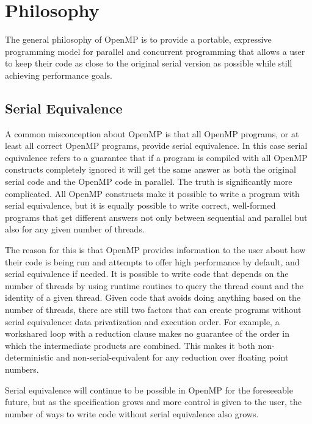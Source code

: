\section{Philosophy}
\label{sec:philosophy}



The general philosophy of OpenMP is to provide a portable, expressive
programming model for parallel and concurrent programming that allows a user to
keep their code as close to the original serial version as possible while still
achieving performance goals.

\subsection{Serial Equivalence}
\label{sub:serial_equivalence}

A common misconception about OpenMP is that all OpenMP programs, or at least all
correct OpenMP programs, provide serial equivalence. In this case serial
equivalence refers to a guarantee that if a program is compiled with all OpenMP
constructs completely ignored it will get the same answer as both the original
serial code and the OpenMP code in parallel.  The truth is significantly more
complicated.  All OpenMP constructs make it possible to write a program with
serial equivalence, but it is equally possible to write correct, well-formed
programs that get different answers not only between sequential and parallel but
also for any given number of threads.

The reason for this is that OpenMP provides information to the user about how
their code is being run and attempts to offer high performance by default, and
serial equivalence if needed.  It is possible to write code that depends on the
number of threads by using runtime routines to query the thread count and the
identity of a given thread.  Given code that avoids doing anything based on the
number of threads, there are still two factors that can create programs without
serial equivalence: data privatization and execution order.  For example, a
workshared loop with a reduction clause makes no guarantee of the order in which
the intermediate products are combined.  This makes it both non-deterministic
and non-serial-equivalent for any reduction over floating point numbers.

Serial equivalence will continue to be possible in OpenMP for the foreseeable
future, but as the specification grows and more control is given to the user,
the number of ways to write code without serial equivalence also grows.

